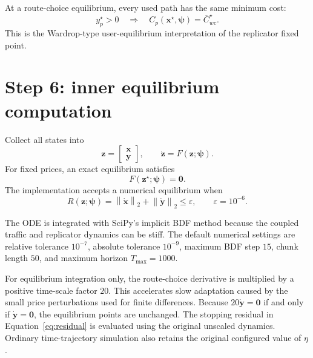 \documentclass[11pt]{article}
\begin{document}
At a route-choice equilibrium, every used path has the same minimum cost:
\begin{equation}
    y_p^{\star}>0
    \quad\Longrightarrow\quad
    C_p(\mathbf x^{\star},\boldsymbol\psi)
    =\overline C_{wc}^{\star}.
    \label{eq:wardrop}
\end{equation}
This is the Wardrop-type user-equilibrium interpretation of the replicator
fixed point.

\section{Step 6: inner equilibrium computation}

Collect all states into
\begin{equation}
    \mathbf z=
    \begin{bmatrix}\mathbf x\\\mathbf y\end{bmatrix},
    \qquad
    \dot{\mathbf z}=F(\mathbf z;\boldsymbol\psi).
\end{equation}
For fixed prices, an exact equilibrium satisfies
\begin{equation}
    F(\mathbf z^{\star};\boldsymbol\psi)=\mathbf 0.
\end{equation}
The implementation accepts a numerical equilibrium when
\begin{equation}
    R(\mathbf z;\boldsymbol\psi)
    =\left\|\dot{\mathbf x}\right\|_2
     +\left\|\dot{\mathbf y}\right\|_2
    \leq\varepsilon,
    \qquad \varepsilon=10^{-6}.
    \label{eq:residual}
\end{equation}

The ODE is integrated with SciPy's implicit BDF method because the coupled
traffic and replicator dynamics can be stiff. The default numerical settings
are relative tolerance $10^{-7}$, absolute tolerance $10^{-9}$, maximum BDF
step $15$, chunk length $50$, and maximum horizon $T_{\max}=1000$.

For equilibrium integration only, the route-choice derivative is multiplied
by a positive time-scale factor $20$. This accelerates slow adaptation caused
by the small price perturbations used for finite differences. Because
$20\dot{\mathbf y}=\mathbf 0$ if and only if
$\dot{\mathbf y}=\mathbf 0$, the equilibrium points are unchanged. The
stopping residual in Equation~\eqref{eq:residual} is evaluated using the
original unscaled dynamics. Ordinary time-trajectory simulation also retains
the original configured value of $\eta$.
\end{document}
